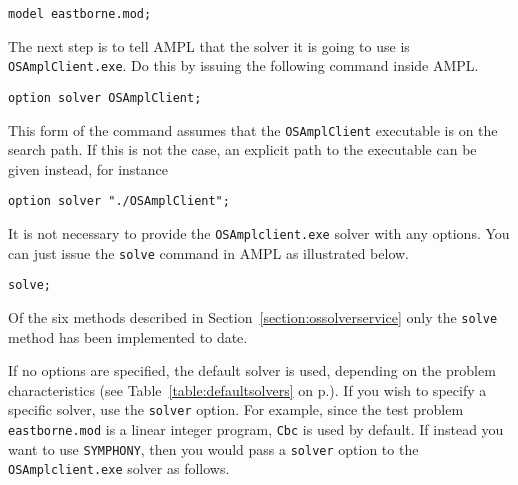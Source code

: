 \begin{verbatim}
model eastborne.mod;
\end{verbatim}

The next step is to tell AMPL that the solver it is going to use is {\tt OSAmplClient.exe}. 
Do this by issuing the following command inside AMPL.

\begin{verbatim}
option solver OSAmplClient;
\end{verbatim}
\ifbible
%
This form of the command assumes that the {\tt OSAmplClient} executable is on the search path. If this is not the case, an explicit path to the executable can be given instead, for instance

\begin{verbatim}
option solver "./OSAmplClient";
\end{verbatim}
\fi

It is not necessary to provide the  {\tt OSAmplclient.exe} solver with any options. 
You can just issue the {\tt solve} command in AMPL as illustrated below.  

\begin{verbatim}
solve;
\end{verbatim}

Of the six methods described in Section~\ref{section:ossolverservice} only the {\tt solve} method 
has been implemented to date.

If no options are specified, the default solver is used, depending on the problem characteristics 
(see Table~\ref{table:defaultsolvers} on p.\pageref{table:defaultsolvers}).
If you wish to specify a specific solver, use the {\tt solver} option.   For example,  
since the test problem {\tt eastborne.mod} is a linear integer program, {\tt Cbc} is used by default. 
If instead you want to  use {\tt SYMPHONY},
then you would pass a {\tt solver} option to the {\tt OSAmplclient.exe} solver as follows.%

